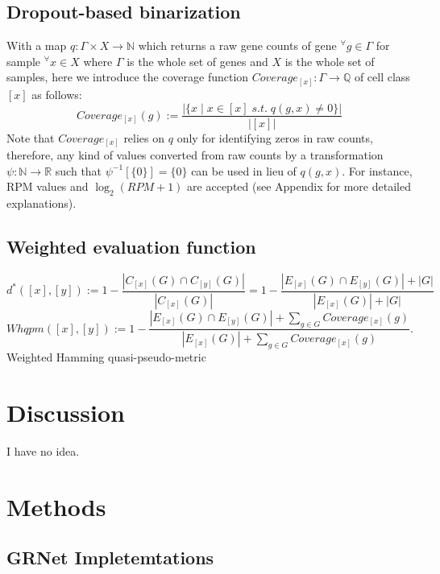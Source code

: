 \documentclass{article}
\begin{document}
\subsection*{Dropout-based binarization}
With a map $q: \Gamma\times X\rightarrow \mathbb{N}$ which returns a raw gene counts
of gene $^\forall g\in\Gamma$ for sample $^\forall x\in X$ where $\Gamma$ is the whole set of genes 
and $X$ is the whole set of samples, here we introduce the coverage function $Coverage_{[x]}: \Gamma\rightarrow\mathbb{Q}$ 
of cell class $[x]$ as follows:
\begin{equation}\label{coverage}
  Coverage_{[x]}(g):=\frac{
    |\{x\;|\;x\in[x]\;s.t.\;q(g,x)\neq 0\}|
  }{
    |[x]|
  }
\end{equation}
Note that $Coverage_{[x]}$ relies on $q$ only for identifying zeros in raw counts, therefore, 
any kind of values converted from raw counts by a transformation $\psi: \mathbb{N}\rightarrow\mathbb{R}$ 
such that $\psi^{-1}[\{0\}]=\{0\}$ can be used in lieu of $q(g, x)$. For instance, \ac{RPM} values 
and $\log_2(RPM+1)$ are accepted (see Appendix for more detailed explanations).

\subsection*{Weighted evaluation function}
\begin{equation}\label{HQPM}
  d^*([x], [y]) := 1 - \frac{|C_{[x]}(G)\cap C_{[y]}(G)|}{|C_{[x]}(G)|}
  =1 - \frac{
    |E_{[x]}(G)\cap E_{[y]}(G)|+|G|
  }{
    |E_{[x]}(G)|+|G|
  }
\end{equation}
\begin{equation}\label{WHQPM}
  Whqpm([x], [y]) := 1 - \frac{
    |E_{[x]}(G)\cap E_{[y]}(G)|+\sum_{g\in G}Coverage_{[x]}(g)
  }{
    |E_{[x]}(G)|+\sum_{g\in G}Coverage_{[x]}(g)
  }.
\end{equation}
Weighted Hamming quasi-pseudo-metric

\section*{Discussion}
I have no idea.

\section*{Methods}
\subsection*{GRNet Impletemtations}
\end{document}
